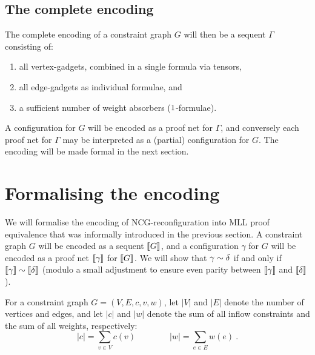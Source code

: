 \documentclass{lmcs}
\let\capsabbrev=\uppercase
\begin{document}

\subsection*{The complete encoding}

The complete encoding of a constraint graph $G$ will then be a sequent $\Gamma$ consisting of:
%
\begin{enumerate}
 	\item
all vertex-gadgets, combined in a single formula via tensors, 
	\item
all edge-gadgets as individual formulae, and
	\item
a sufficient number of weight absorbers ($1$-formulae).
\end{enumerate}
%
A configuration for $G$ will be encoded as a proof net for $\Gamma$, and conversely each proof net for $\Gamma$ may be interpreted as a (partial) configuration for $G$. The encoding will be made formal in the next section.




\section{Formalising the encoding}
\label{sec:correctness}


We will formalise the encoding of \capsabbrev{ncg}-reconfiguration into \capsabbrev{mll} proof equivalence that was informally introduced in the previous section. A constraint graph $G$ will be encoded as a sequent $\llbracket G\rrbracket$, and a configuration $\gamma$ for $G$ will be encoded as a proof net $\llbracket\gamma\rrbracket$ for $\llbracket G\rrbracket$. We will show that $\gamma\perm\delta$ if and only if $\itn\gamma\perm\itn\delta$ (modulo a small adjustment to ensure even parity between $\llbracket\gamma\rrbracket$ and $\llbracket\delta\rrbracket$).

For a constraint graph $G=(V,E,c,v,w)$, let $|V|$ and $|E|$ denote the number of vertices and edges, and let $|c|$ and $|w|$ denote the sum of all inflow constraints and the sum of all weights, respectively:
\[
	|c| = \sum_{v\in V}c(v) \qquad\qquad |w| = \sum_{e\in E}w(e)~.
\]
\end{document}

